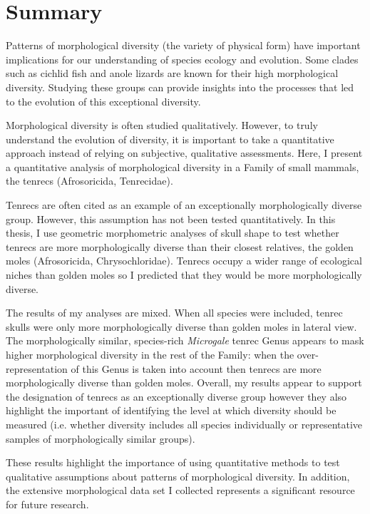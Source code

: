 \chapter*{Summary}

	Patterns of morphological diversity (the variety of physical form) have important implications for our understanding of species ecology and evolution. Some clades such as cichlid fish and anole lizards are known for their high morphological diversity. Studying these groups can provide insights into the processes that led to the evolution of this exceptional diversity. 

	Morphological diversity is often studied qualitatively. However, to truly understand the evolution of diversity, it is important to take a quantitative approach instead of relying on subjective, qualitative assessments. Here, I present a quantitative analysis of morphological diversity in a Family of small mammals, the tenrecs (Afrosoricida, Tenrecidae). 
	
	Tenrecs are often cited as an example of an exceptionally morphologically diverse group. However, this assumption has not been tested quantitatively. In this thesis, I use geometric morphometric analyses of skull shape to test whether tenrecs are more morphologically diverse than their closest relatives, the golden moles (Afrosoricida, Chrysochloridae). Tenrecs occupy a wider range of ecological niches than golden moles so I predicted that they would be more morphologically diverse. 
	
	The results of my analyses are mixed. When all species were included, tenrec skulls were only more morphologically diverse than golden moles in lateral view. The morphologically similar, species-rich \textit{Microgale} tenrec Genus appears to mask higher morphological diversity in the rest of the Family: when the over-representation of this Genus is taken into account then tenrecs are more morphologically diverse than golden moles.
	Overall, my results appear to support the designation of tenrecs as an exceptionally diverse group however they also highlight the important of identifying the level at which diversity should be measured (i.e. whether diversity includes all species individually or representative samples of morphologically similar groups).
	
	These results highlight the importance of using quantitative methods to test qualitative assumptions about patterns of morphological diversity. In addition, the extensive morphological data set I collected represents a significant resource for future research.
	
